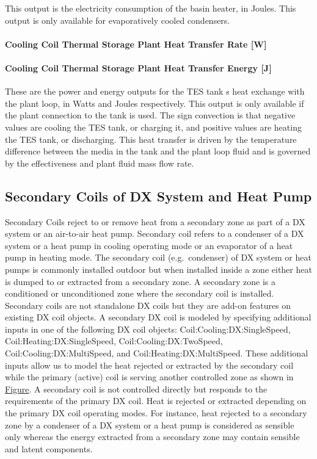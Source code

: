 This output is the electricity consumption of the basin heater, in Joules. This output is only available for evaporatively cooled condensers.

\paragraph{Cooling Coil Thermal Storage Plant Heat Transfer Rate {[}W{]}}\label{cooling-coil-thermal-storage-plant-heat-transfer-rate-w}

\paragraph{Cooling Coil Thermal Storage Plant Heat Transfer Energy {[}J{]}}\label{cooling-coil-thermal-storage-plant-heat-transfer-energy-j}

These are the power and energy outputs for the TES tank s heat exchange with the plant loop, in Watts and Joules respectively. This output is only available if the plant connection to the tank is used. The sign convection is that negative values are cooling the TES tank, or charging it, and positive values are heating the TES tank, or discharging. This heat transfer is driven by the temperature difference between the media in the tank and the plant loop fluid and is governed by the effectiveness and plant fluid mass flow rate.

\subsection{Secondary Coils of DX System and Heat Pump}\label{secondary-coils-of-dx-system-and-heat-pump}

Secondary Coils reject to or remove heat from a secondary zone as part of a DX system or an air-to-air heat pump. Secondary coil refers to a condenser of a DX system or a heat pump in cooling operating mode or an evaporator of a heat pump in heating mode. The secondary coil (e.g.~condenser) of DX system or heat pumps is commonly installed outdoor but when installed inside a zone either heat is dumped to or extracted from a secondary zone. A secondary zone is a conditioned or unconditioned zone where the secondary coil is installed. Secondary coils are not standalone DX coils but they are add-on features on existing DX coil objects. A secondary DX coil is modeled by specifying additional inputs in one of the following DX coil objects: Coil:Cooling:DX:SingleSpeed, Coil:Heating:DX:SingleSpeed, Coil:Cooling:DX:TwoSpeed, Coil:Cooling:DX:MultiSpeed, and Coil:Heating:DX:MultiSpeed. These additional inputs allow us to model the heat rejected or extracted by the secondary coil while the primary (active) coil is serving another controlled zone as shown in \protect\hyperlink{SecondaryCoilsFigure1}{Figure}. A secondary coil is not controlled directly but responds to the requirements of the primary DX coil. Heat is rejected or extracted depending on the primary DX coil operating modes. For instance, heat rejected to a secondary zone by a condenser of a DX system or a heat pump is considered as sensible only whereas the energy extracted from a secondary zone may contain sensible and latent components.

